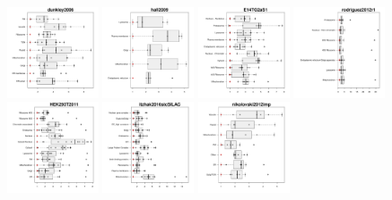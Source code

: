 \documentclass[12pt]{article}\usepackage[]{graphicx}\usepackage[]{color}
\begin{document}
\begin{figure}[p]
  \includegraphics[width = 0.24\textwidth]{./figure/allqseps-8.pdf}
  \includegraphics[width = 0.24\textwidth]{./figure/allqseps-9.pdf}
  \includegraphics[width = 0.24\textwidth]{./figure/allqseps-10.pdf}
  \includegraphics[width = 0.24\textwidth]{./figure/allqseps-11.pdf}
  \includegraphics[width = 0.24\textwidth]{./figure/allqseps-12.pdf}
  \includegraphics[width = 0.24\textwidth]{./figure/allqseps-13.pdf}
  \includegraphics[width = 0.24\textwidth]{./figure/allqseps-14.pdf}

\end{figure}
\end{document}
